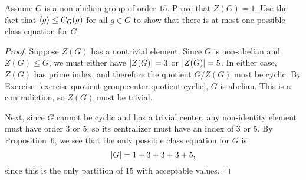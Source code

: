  Assume $G$ is a non-abelian group of order $15$. Prove that
$Z(G) = 1$. Use the fact that $\langle{g}\rangle \leq C_G(g)$ for all $g\in G$
to show that there is at most one possible class equation for $G$.
\begin{proof}
  Suppose $Z(G)$ has a nontrivial element. Since $G$ is non-abelian
  and $Z(G)\leq G$, we must either have $\lvert{Z(G)}\rvert = 3$ or
  $\lvert{Z(G)}\rvert = 5$. In either case, $Z(G)$ has prime index, and
  therefore the quotient $G/Z(G)$ must be cyclic. By
  Exercise~\ref{exercise:quotient-group:center-quotient-cyclic}, $G$
  is abelian. This is a contradiction, so $Z(G)$ must be trivial.

  Next, since $G$ cannot be cyclic and has a trivial center, any
  non-identity element must have order $3$ or $5$, so its centralizer
  must have an index of $3$ or $5$. By Proposition~6, we see that the
  only possible class equation for $G$ is
  \begin{equation*}
    \lvert{G}\rvert = 1 + 3 + 3 + 3 + 5,
  \end{equation*}
  since this is the only partition of $15$ with acceptable values.
\end{proof}
